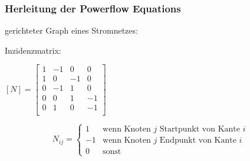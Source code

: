 \documentclass[aspectratio=169,t]{beamer}
\begin{document}
\begin{frame}
	\frametitle{Herleitung der Powerflow Equations}
	
	\vspace*{2mm}
	\begin{minipage}{1\linewidth}
		\begin{minipage}{.4\linewidth}
			
			gerichteter Graph eines Stromnetzes:
			
		\end{minipage}
		\hfill
		\begin{minipage}{.6\linewidth}
			\centering
			
			Inzidenzmatrix:			
			
		\end{minipage}
	\end{minipage}	
	
	\vspace*{4mm}
	\begin{minipage}{1\linewidth}
		\begin{minipage}{.4\linewidth}
			
			
		\end{minipage}
		\hfill
		\begin{minipage}{.6\linewidth}
			\centering
							
			$\left[N\right] =\left[ \begin{array}{rrrr}
				1 & -1 & 0 & 0 \\
				1 & 0 & -1 & 0\\
				0 & -1 & 1 & 0\\
				0& 0 & 1 & -1 \\
				0& 1 & 0 & -1 \\
			\end{array}\right]$
			
				$$N_{ij} = \begin{cases}
				1 & \text{wenn Knoten $j$ Startpunkt von Kante $i$ }\\
				-1 & \text{wenn Knoten $j$ Endpunkt von Kante $i$  }\\
				0 & \text{sonst} 
			\end{cases}$$
		
		\end{minipage}
	\end{minipage}	
	
	
\end{frame}
\end{document}

